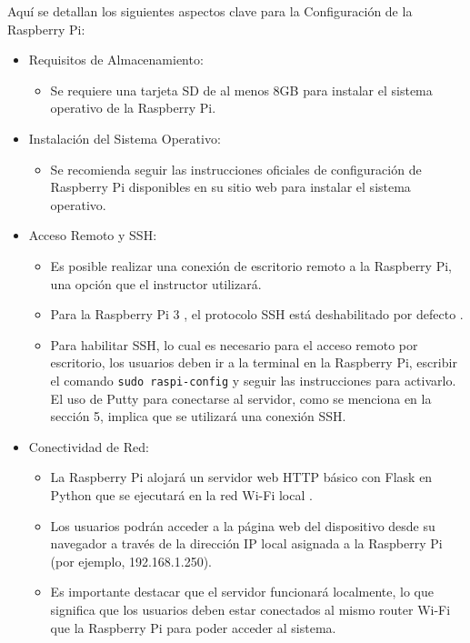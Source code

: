 \documentclass{report}
\begin{document}
Aquí se detallan los siguientes aspectos clave para la  Configuración de la Raspberry Pi:
\begin{itemize}
    \item Requisitos de Almacenamiento:
    \begin{itemize}
        \item Se requiere una  tarjeta SD de al menos 8GB  para instalar el sistema operativo de la Raspberry Pi.
    \end{itemize}

    \item Instalación del Sistema Operativo:
    \begin{itemize}
        \item Se recomienda seguir las  instrucciones oficiales de configuración de Raspberry Pi  disponibles en su sitio web para instalar el sistema 
        operativo.
    \end{itemize}

    \item Acceso Remoto y SSH:
    \begin{itemize}
        \item Es posible realizar una  conexión de escritorio remoto  a la Raspberry Pi, una opción que el instructor utilizará.
        \item Para la  Raspberry Pi 3 , el protocolo  SSH está deshabilitado por defecto .
        \item Para habilitar SSH, lo cual es necesario para el acceso remoto por escritorio, los usuarios deben ir a la terminal en la Raspberry Pi, 
        escribir el comando \verb|sudo raspi-config| y seguir las instrucciones para activarlo. El uso de  Putty  para conectarse al servidor, como se 
        menciona en la sección 5, implica que se utilizará una conexión SSH.
    \end{itemize}
    
    \item Conectividad de Red:
    \begin{itemize}
        \item La Raspberry Pi alojará un  servidor web HTTP básico con Flask en Python  que se ejecutará en la  red Wi-Fi local .
        \item Los usuarios podrán acceder a la página web del dispositivo desde su navegador a través de la  dirección IP local  asignada a la 
        Raspberry Pi (por ejemplo, 192.168.1.250).
        \item Es importante destacar que el servidor funcionará localmente, lo que significa que los usuarios deben estar  conectados al mismo router 
        Wi-Fi  que la Raspberry Pi para poder acceder al sistema.
    \end{itemize}


\end{itemize}
\end{document}
